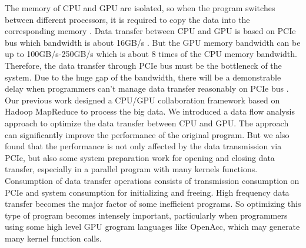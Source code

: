 \documentclass[10pt,conference]{IEEEtran}
\begin{document}
The memory of CPU and GPU are isolated, so when the program switches between different processors, it is required to copy the data into the corresponding memory \cite{IEEEhowto:9}\cite{IEEEhowto:10}.
Data transfer between CPU and GPU is based on PCIe bus which bandwidth is about 16GB/s \cite{IEEEhowto:11}\cite{IEEEhowto:12}.
But the GPU memory bandwidth can be up to  100GB/s-250GB/s which is about 8 times of the CPU memory bandwidth. Therefore, the data transfer through PCIe bus must be the bottleneck of the system.
Due to the huge gap of the bandwidth, there will be a demonstrable delay when programmers can't manage data transfer reasonably on PCIe bus \cite{IEEEhowto:13}.
Our previous work designed a CPU/GPU collaboration framework based on Hadoop MapReduce to process the big data\cite{IEEEhowto:21}. We introduced a data flow analysis approach to optimize the data transfer between CPU and GPU\cite{IEEEhowto:22}. The approach can significantly improve the performance of the original program. But we also found that the performance is not only affected by the data transmission via PCIe, but also some system preparation work for opening and closing data transfer, especially in a parallel program with many kernels functions. Consumption of data transfer operations consists of transmission consumption on PCIe and system consumption for initializing and freeing. High frequency data transfer becomes the major factor of some inefficient programs. So optimizing this type of program becomes intensely important, particularly when programmers using some high level GPU grogram languages like OpenAcc, which may generate many kernel function calls.
\end{document}
